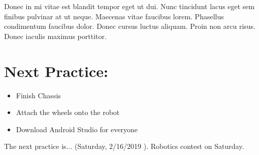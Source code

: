 \documentclass[12pt]{article}
\begin{document}
Donec in mi vitae est blandit tempor eget ut dui. Nunc tincidunt lacus eget sem finibus pulvinar at ut neque. Maecenas vitae faucibus lorem. Phasellus condimentum faucibus dolor. Donec cursus luctus aliquam. Proin non arcu risus. Donec iaculis maximus porttitor.

\section{Next Practice:}
\begin{itemize}
	\item Finish Chassis
\item Attach the wheels onto the robot
\item Download Android Studio for everyone
\end{itemize}

The next practice is... (Saturday, 2/16/2019 ). Robotics contest on Saturday. 
\end{document}
